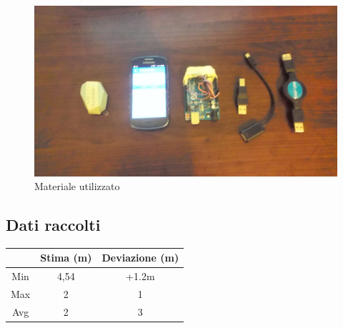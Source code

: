 \begin{figure}[ph]
	\centering
	\includegraphics[width=0.8\linewidth]{img/otg/otg3.jpg}
	\caption{Materiale utilizzato}
\end{figure}

\newpage
\subsection{Dati raccolti}

\begin{tabular}{|c|c|c|}
	\hline 
	& Stima (m) & Deviazione (m) \\ 
	\hline 
	Min & 4,54 & +1.2m \\ 
	\hline 
	Max & 2 & 1 \\ 
	\hline 
	Avg & 2 & 3 \\ 
	\hline 
\end{tabular} 
